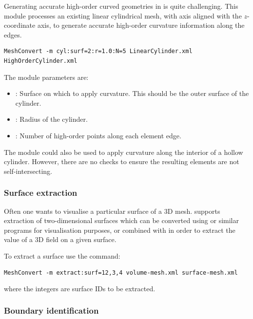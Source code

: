 Generating accurate high-order curved geometries in \gmsh is quite challenging.
This module processes an existing linear cylindrical mesh, with axis aligned
with the $z$-coordinate axis, to generate accurate high-order curvature
information along the edges.

\begin{lstlisting}[style=BashInputStyle]
MeshConvert -m cyl:surf=2:r=1.0:N=5 LinearCylinder.xml HighOrderCylinder.xml
\end{lstlisting}

The module parameters are:

\begin{itemize}
  \item {}: Surface on which to apply curvature. This should be the
  outer surface of the cylinder.
  \item {}: Radius of the cylinder.
  \item {}: Number of high-order points along each element edge.
\end{itemize}

\begin{notebox}
  The module could also be used to apply curvature along the interior of a
  hollow cylinder. However, there are no checks to ensure the resulting elements
  are not self-intersecting.
\end{notebox}

\subsubsection{Surface extraction}

Often one wants to visualise a particular surface of a 3D mesh. \mc supports
extraction of two-dimensional surfaces which can be converted using
 or similar programs for visualisation purposes, or combined
with  in order to extract the value of a 3D field on a given
surface.

To extract a surface use the command:

\begin{lstlisting}[style=BashInputStyle]
  MeshConvert -m extract:surf=12,3,4 volume-mesh.xml surface-mesh.xml
\end{lstlisting}

where the integers are surface IDs to be extracted.

\subsubsection{Boundary identification}

